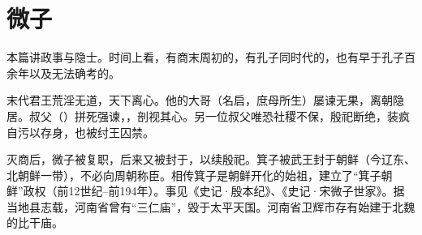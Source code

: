 \chapter{微子}

本篇讲政事与隐士。时间上看，有商末周初的，有孔子同时代的，也有早于孔子百余年以及无法确考的。

\bigskip

{
\item {}末代君王荒淫无道，天下离心。他的大哥（名启，庶母所生）屡谏无果，离朝隐居。叔父（）拼死强谏，，剖视其心。另一位叔父唯恐社稷不保，殷祀断绝，装疯自污以存身，也被纣王囚禁。

灭商后，微子被复职，后来又被封于，以续殷祀。箕子被武王封于朝鲜（今辽东、北朝鲜一带），不必向周朝称臣。相传箕子是朝鲜开化的始祖，建立了“箕子朝鲜”政权（前12世纪--前194年）。事见《史记·殷本纪》、《史记·宋微子世家》。据当地县志载，河南省曾有“三仁庙”，毁于太平天国。河南省卫辉市存有始建于北魏的比干庙。
}
{}


